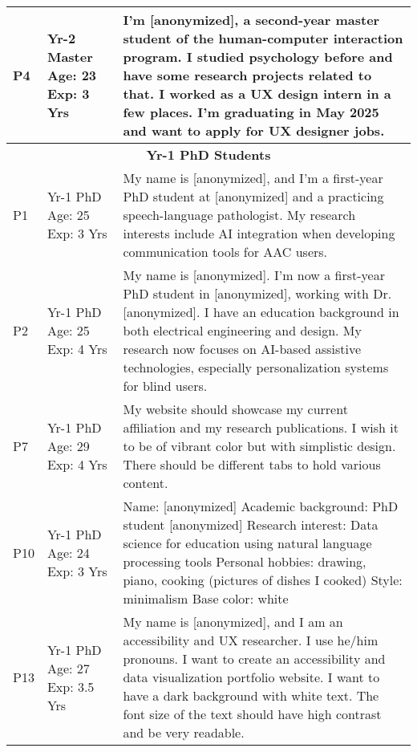 \begin{longtable}{|p{1cm}|p{2cm}|p{10cm}|}
P4 & Yr-2 Master \newline Age: 23 \newline Exp: 3 Yrs & I'm [anonymized], a second-year master student of the human-computer interaction program. I studied psychology before and have some research projects related to that. I worked as a UX design intern in a few places. I'm graduating in May 2025 and want to apply for UX designer jobs. \\ \hline
\multicolumn{3}{|c|}{\textbf{Yr-1 PhD Students}} \\ \hline
P1 & Yr-1 PhD \newline Age: 25 \newline Exp: 3 Yrs & My name is [anonymized], and I'm a first-year PhD student at [anonymized] and a practicing speech-language pathologist. My research interests include AI integration when developing communication tools for AAC users. \\ \hline
P2 & Yr-1 PhD \newline Age: 25 \newline Exp: 4 Yrs & My name is [anonymized]. I'm now a first-year PhD student in [anonymized], working with Dr. [anonymized]. I have an education background in both electrical engineering and design. My research now focuses on AI-based assistive technologies, especially personalization systems for blind users. \\ \hline
P7 & Yr-1 PhD \newline Age: 29 \newline Exp: 4 Yrs & My website should showcase my current affiliation and my research publications. I wish it to be of vibrant color but with simplistic design. There should be different tabs to hold various content. \\ \hline
P10 & Yr-1 PhD \newline Age: 24 \newline Exp: 3 Yrs & Name: [anonymized] \newline Academic background: PhD student [anonymized] \newline Research interest: Data science for education using natural language processing tools \newline Personal hobbies: drawing, piano, cooking (pictures of dishes I cooked) \newline Style: minimalism \newline Base color: white \\ \hline
P13 & Yr-1 PhD \newline Age: 27 \newline Exp: 3.5 Yrs & My name is [anonymized], and I am an accessibility and UX researcher. I use he/him pronouns. I want to create an accessibility and data visualization portfolio website. I want to have a dark background with white text. The font size of the text should have high contrast and be very readable. \\ \hline

\end{longtable}
